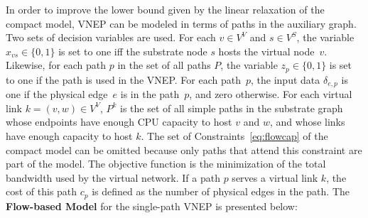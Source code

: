 \begin{comment}
\begin{align}
  \sum\limits_{k \in E^{V}}\sum\limits_{p \in P^k : (v,s) \in p} z_{p} \leq M x_{v,s}       & \quad \forall v \in V^{V}, s \in V^{S}
  \label{eq:final}
\end{align}

Where $M$ is a number larger than or equal to the maximum degree of the virtual network. Thus, if $x_{v,s}$ is set to zero, no path that maps $v$ to $s$ can be used.

Therefore, replacing variables $y$ by the new decomposed variables $z$ in the compact model, we obtain the flow-based Model (note that Constraints \eqref{eq:flowcap} could be omitted, since they are by definition respected):
\end{comment}

In order to improve the lower bound given by the linear relaxation of the compact model, VNEP can be modeled in terms of paths in the auxiliary graph. 
Two sets of decision variables are used. For each $v \in V^{V}$ and $s \in V^{S}$, the variable $x_{vs} \in \{0,1\}$ is set to one iff the substrate node $s$ hosts the virtual node~$v$. 
Likewise, for each path $p$ in the set of all paths $P$, the variable $z_{p} \in \{0,1\}$ is set to one if the path is used in the VNEP. 
For each path~$p$, the input data $\delta_{e,p}$ is one if the physical edge~$e$ is in the path~$p$, and zero otherwise.
For each virtual link $k=(v,w) \in V^V$, $P^k$ is the set of all simple paths in the substrate graph whose endpoints have enough CPU capacity to host $v$ and $w$, and whose links have enough capacity to host $k$.
The set of Constraints~\eqref{eq:flowcap} of the compact model can be omitted because only paths that attend this constraint are part of the model.
The objective function is the minimization of the total bandwidth used by the virtual network. 
If a path $p$ serves a virtual link $k$, the cost of this path $c_{p}$ is defined as the number of physical edges in the path.
The \textbf{Flow-based Model} for the single-path VNEP is presented below:


